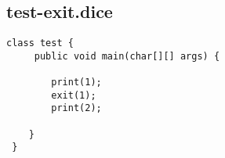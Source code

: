 \subsection{test-exit.dice}
\begin{verbatim}
class test {
	 public void main(char[][] args) {
		
		print(1);
		exit(1);
		print(2);

 	}
 }
\end{verbatim}